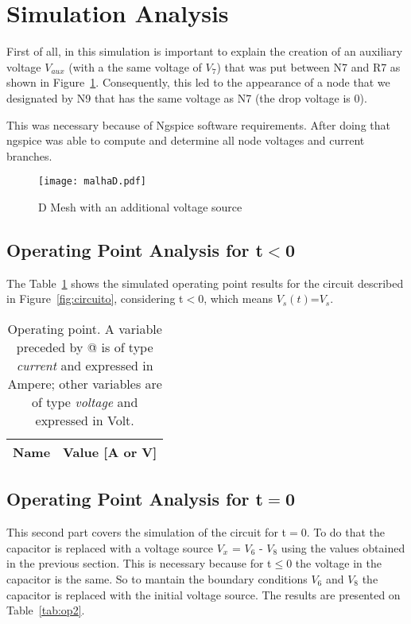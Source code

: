 \section{Simulation Analysis}

\label{sec:simulation}
First of all, in this simulation is important to explain the creation of an auxiliary voltage $V_{aux}$ (with a the same voltage of $V_{7}$) that was put between N7 and R7 as shown in Figure~\ref{fig:malhaD}. Consequently, this led to the appearance of a node that we designated by N9 that has the same voltage as N7 (the drop voltage is 0). 

This was necessary because of Ngspice software requirements. After doing that ngspice was able to compute and determine all node voltages and current branches.

\begin{figure}[!ht] \centering
\texttt{[image: malhaD.pdf]}
\caption{D Mesh with an additional voltage source} 
\label{fig:malhaD}
\end{figure}


\subsection{Operating Point Analysis for t$<$0}

The Table~\ref{tab:op1} shows the simulated operating point results for the circuit described in Figure~\ref{fig:circuito}, considering t$<$0, which means $V_{s}(t)$=$V_{s}$.

\begin{table}[!ht]
  \centering
  \begin{tabular}{|l|r|}
    \hline    
    {\bf Name} & {\bf Value [A or V]} \\ \hline
    
  \end{tabular}
  \caption{Operating point. A variable preceded by @ is of type {\em current}
    and expressed in Ampere; other variables are of type {\it voltage} and expressed in
    Volt.}
  \label{tab:op1}
\end{table}

\subsection{Operating Point Analysis for t$=$0}

This second part covers the simulation of the circuit for t$=$0. To do that the capacitor is replaced with a voltage source $V_{x}$ = $V_{6}$ - $V_{8}$ using the values obtained in the previous section. This is necessary because for t$\leq$0 the voltage in the capacitor is the same. So to mantain the boundary conditions $V_{6}$ and $V_{8}$ the capacitor is replaced with the initial voltage source.
The results are presented on Table~\ref{tab:op2}.
\newline
\newline

